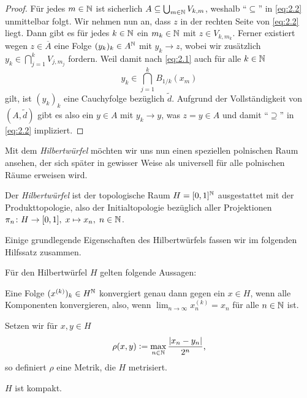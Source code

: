 \documentclass[../main/main.tex]{subfiles}
\begin{document}
\begin{proof}
		Für jedes $m \in \mathbb{N}$ ist sicherlich $A \subseteq 
		\bigcup_{m \in \mathbb{N}} V_{k, m}$, weshalb \enquote{$\subseteq$} 
		in \eqref{eq:2.2} unmittelbar folgt.
		Wir nehmen nun an, dass $z$ in der rechten Seite von \eqref{eq:2.2} liegt. 
		Dann gibt es für jedes $k \in \mathbb{N}$ ein $m_k \in \mathbb{N}$ mit $z \in V_{k, m_k}$. 
		Ferner existiert wegen $z \in \overline{A}$ eine Folge $(y_k)_k \in A^{\mathbb{N}}$ 
		mit $y_k \to z$, wobei wir zusätzlich
		$y_k \in \bigcap_{j=1}^{k} V_{j, m_j}$
		fordern. Weil damit nach \eqref{eq:2.1} auch für alle $k \in \mathbb{N}$
		\[y_k \in \bigcap_{j=1}^{k} B_{1/k}(x_m)\]
		gilt, ist $(y_k)_k$ eine Cauchyfolge bezüglich $\tilde{d}$. Aufgrund der Vollständigkeit von 
		$(A, \tilde{d})$ gibt es also ein $y \in A$ mit $y_k \to y$, was 
		$z = y \in A$ und damit \enquote{$\supseteq$} 
		in \eqref{eq:2.2} impliziert.
	\end{proof}
	
	Mit dem \emph{Hilbertwürfel} möchten wir uns nun einen speziellen polnischen Raum ansehen, 
	der sich später in gewisser Weise als universell für alle polnischen Räume erweisen wird.
	
	\begin{Definition}[Hilbertwürfel]
		Der \emph{Hilbertwürfel} ist der topologische Raum $H = [0, 1]^{\mathbb{N}}$ 
		ausgestattet mit der Produkttopologie, also der Initialtopologie bezüglich 
		aller Projektionen $\pi_n \colon H \to [0, 1], \; x \mapsto x_n , \; n \in \mathbb{N}$.
	\end{Definition}

	Einige grundlegende Eigenschaften des Hilbertwürfels fassen wir im folgenden Hilfssatz zusammen.
	
	\begin{Hilfssatz}
		\label{lem:hilbertcube}
		Für den Hilbertwürfel $H$ gelten folgende Aussagen:
		\begin{enumeratethm}
			\item Eine Folge $(x^{(k)})_k \in H^{\mathbb{N}}$ konvergiert genau dann gegen 
			ein $x \in H$, wenn alle Komponenten konvergieren, also, wenn
			$\lim_{n \to \infty} x_n^{(k)} = x_n$ für alle $n \in \mathbb{N}$ ist.
			\item Setzen wir für $x, y \in H$
			$$\rho(x, y) \vcentcolon = \max_{n \in \mathbb{N}} \frac{|x_n - y_n|}{2^n} \text{,}$$
			so definiert $\rho$ eine Metrik, die $H$ metrisiert.
			\item $H$ ist kompakt.
		\end{enumeratethm}
	\end{Hilfssatz}
	
\end{document}
